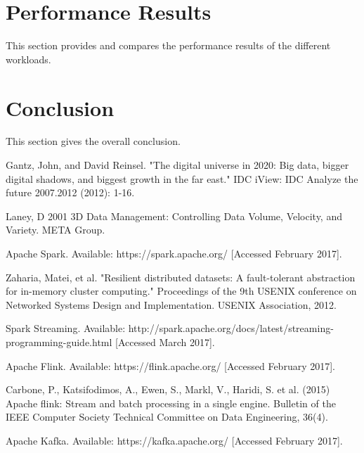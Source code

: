\documentclass[]{article}
\begin{document}
\section{Performance Results}

This section provides and compares the performance results of the different workloads.

\section{Conclusion}
This section gives the overall conclusion.


\begin{thebibliography}{[MT1]}
%
Gantz, John, and David Reinsel. "The digital universe in 2020: Big data, bigger digital shadows, and biggest growth in the far east." IDC iView: IDC Analyze the future 2007.2012 (2012): 1-16.

Laney, D 2001 3D Data Management: Controlling Data Volume, Velocity, and Variety. META Group.

Apache Spark. Available: https://spark.apache.org/ [Accessed February 2017].

Zaharia, Matei, et al. "Resilient distributed datasets: A fault-tolerant abstraction for in-memory cluster computing." Proceedings of the 9th USENIX conference on Networked Systems Design and Implementation. USENIX Association, 2012.

Spark Streaming. Available: http://spark.apache.org/docs/latest/streaming-programming-guide.html [Accessed March 2017].

Apache Flink. Available: https://flink.apache.org/ [Accessed February 2017].

Carbone, P., Katsifodimos, A., Ewen, S., Markl, V., Haridi, S. et al. (2015)
Apache flink: Stream and batch processing in a single engine.
Bulletin of the IEEE Computer Society Technical Committee on Data Engineering, 36(4).

Apache Kafka. Available: https://kafka.apache.org/ [Accessed February 2017].


%
\end{thebibliography}
\end{document}
